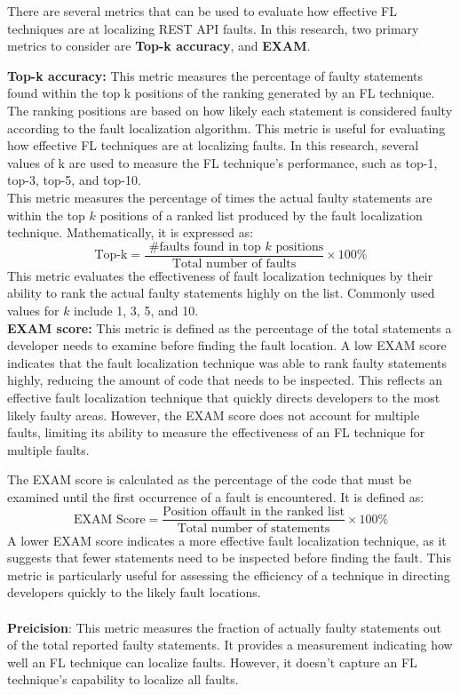 \documentclass[conference]{IEEEtran}
\begin{document}
There are several metrics that can be used to evaluate how effective FL techniques are at localizing REST API faults. In this research, two primary metrics to consider are \textbf{Top-k accuracy}, and \textbf{EXAM}.


   
     \textbf{Top-k accuracy:} This metric measures the percentage of faulty statements found within the top k positions of the ranking generated by an FL technique. The ranking positions are based on how likely each statement is considered faulty according to the fault localization algorithm. This metric is useful for evaluating how effective FL techniques are at localizing faults. In this research, several values of k are used to measure the FL technique's performance, such as top-1, top-3, top-5, and top-10.
    \\
    This metric measures the percentage of times the actual faulty statements are within the top $k$ positions of a ranked list produced by the fault localization technique. Mathematically, it is expressed as:
    \[
    \text{Top-k} = \frac{\text{ \#faults found in top } k \text{ positions}}{\text{Total number of faults}} \times 100\%
    \]
    This metric evaluates the effectiveness of fault localization techniques by their ability to rank the actual faulty statements highly on the list. Commonly used values for $k$ include 1, 3, 5, and 10.
    \\

    \textbf{EXAM score:}  This metric is defined as the percentage of the total statements a developer needs to examine before finding the fault location. A low EXAM score indicates that the fault localization technique was able to rank faulty statements highly, reducing the amount of code that needs to be inspected. This reflects an effective fault localization technique that quickly directs developers to the most likely faulty areas. However, the EXAM score does not account for multiple faults, limiting its ability to measure the effectiveness of an FL technique for multiple faults.

    The EXAM score is calculated as the percentage of the code that must be examined until the first occurrence of a fault is encountered. It is defined as:
    \\
    \[
    \text{EXAM Score} = \frac{\text{Position offault in the ranked list}}{\text{Total number of statements}} \times 100\%
    \]
    A lower EXAM score indicates a more effective fault localization technique, as it suggests that fewer statements need to be inspected before finding the fault. This metric is particularly useful for assessing the efficiency of a technique in directing developers quickly to the likely fault locations.
    \\ \\
    \textbf{Preicision}: This metric measures the fraction of actually faulty statements out of the total reported faulty statements. It provides a measurement indicating how well an FL technique can localize faults. However, it doesn't capture an FL technique's capability to localize all faults.
    \\
\end{document}
